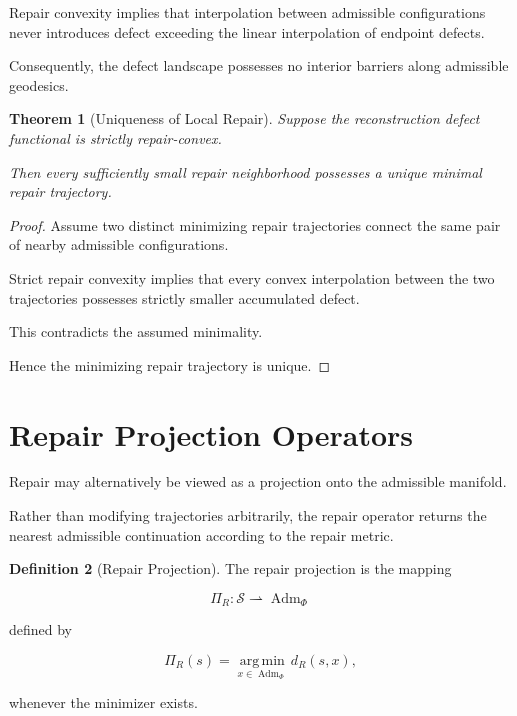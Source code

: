 \documentclass[11pt]{book}
\numberwithin{equation}{chapter}
\theoremstyle{definition}
\newtheorem{definition}{Definition}[chapter]
\theoremstyle{plain}
\newtheorem{theorem}[definition]{Theorem}
\begin{document}
Repair convexity implies that interpolation between admissible
configurations never introduces defect exceeding the linear
interpolation of endpoint defects.

Consequently, the defect landscape possesses no interior barriers
along admissible geodesics.

\begin{theorem}[Uniqueness of Local Repair]

Suppose the reconstruction defect functional is strictly repair-convex.

Then every sufficiently small repair neighborhood possesses a unique
minimal repair trajectory.

\end{theorem}

\begin{proof}

Assume two distinct minimizing repair trajectories connect the same
pair of nearby admissible configurations.

Strict repair convexity implies that every convex interpolation
between the two trajectories possesses strictly smaller accumulated
defect.

This contradicts the assumed minimality.

Hence the minimizing repair trajectory is unique.

\end{proof}

\section{Repair Projection Operators}

Repair may alternatively be viewed as a projection onto the admissible
manifold.

Rather than modifying trajectories arbitrarily, the repair operator
returns the nearest admissible continuation according to the repair
metric.

\begin{definition}[Repair Projection]

The repair projection is the mapping

\[
\Pi_R:
\mathcal S
\rightharpoonup
\operatorname{Adm}_{\Phi}
\]

defined by

\[
\Pi_R(s)
=
\operatorname*{arg\,min}_{x\in\operatorname{Adm}_{\Phi}}
d_R(s,x),
\]

whenever the minimizer exists.

\end{definition}
\end{document}
